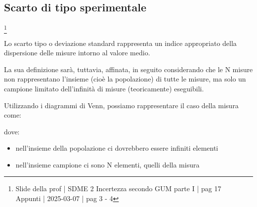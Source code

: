 \newpage

\subsection{Scarto di tipo sperimentale}
\footnote{Slide della prof | SDME 2 Incertezza secondo GUM parte I | pag 17 \\  
Appunti | 2025-03-07 | pag 3 - 4}

Lo scarto tipo o deviazione standard rappresenta un indice appropriato della dispersione delle misure intorno al valore medio. \newline 

La sua definizione sarà, tuttavia, affinata, in seguito considerando che le N misure non rappresentano l'insieme (cioè la popolazione) di tutte 
le misure, 
ma solo un campione limitato dell'infinità di misure (teoricamente) eseguibili. \newline 

Utilizzando i diagrammi di Venn, possiamo rappresentare il caso della misura come:




{
    \begin{center}
    \end{center}
    
}

dove: 

\begin{itemize}
    \item nell'insieme della popolazione ci dovrebbero essere infiniti elementi 
    \item nell'insieme campione ci sono N elementi, quelli della misura
\end{itemize}

